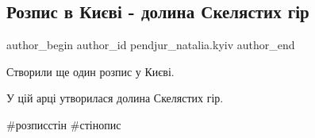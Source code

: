  
 
 
 
 

\subsection{Розпис в Києві - долина Скелястих гір}
\label{sec:07_09_2023.fb.pendjur_natalia.kyiv.1.rozpys_v_kyevi_dolyna_skeljastyh_gir}

\ifcmt
 author_begin
   author_id pendjur_natalia.kyiv
 author_end
\fi

Створили ще один розпис у Києві.

У цій арці утворилася долина Скелястих гір.

\#розписстін \#стінопис

